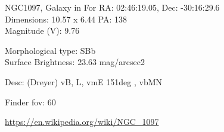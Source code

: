 \begin{block}{NGC1097, Galaxy in For}
    RA: 02:46:19.05, Dec: -30:16:29.6 \\ 
    Dimensions: 10.57 x 6.44 PA: 138 \\ 
    Magnitude (V): 9.76

    Morphological type: SBb \\ 
    Surface Brightness: 23.63 mag/arcsec2 

    Desc: (Dreyer) vB, L, vmE 151deg , vbMN 

    Finder fov: 60 

    \url{https://en.wikipedia.org/wiki/NGC_1097} 
\end{block}